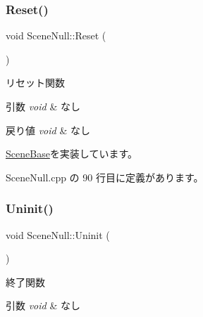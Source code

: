 \mbox{\label{class_scene_null_ae71209e6283270d35a3fad40103e9572}} 
\subsubsection{\texorpdfstring{Reset()}{Reset()}}
{\footnotesize\ttfamily void Scene\+Null\+::\+Reset (\begin{DoxyParamCaption}{ }\end{DoxyParamCaption})\hspace{0.3cm}{\ttfamily [virtual]}}



リセット関数 


\begin{DoxyParams}{引数}
{\em void} & なし \\
\hline
\end{DoxyParams}

\begin{DoxyRetVals}{戻り値}
{\em void} & なし \\
\hline
\end{DoxyRetVals}


\mbox{\hyperlink{class_scene_base_a80611ca266dc84f466b96913ace28b8e}{Scene\+Base}}を実装しています。



 Scene\+Null.\+cpp の 90 行目に定義があります。

\mbox{\label{class_scene_null_abbff54a7323b5ccde4b5094757747738}} 
\subsubsection{\texorpdfstring{Uninit()}{Uninit()}}
{\footnotesize\ttfamily void Scene\+Null\+::\+Uninit (\begin{DoxyParamCaption}{ }\end{DoxyParamCaption})\hspace{0.3cm}{\ttfamily [virtual]}}



終了関数 


\begin{DoxyParams}{引数}
{\em void} & なし \\
\hline
\end{DoxyParams}

